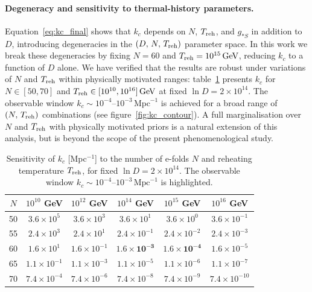 \paragraph{Degeneracy and sensitivity to thermal-history parameters.}
Equation~\eqref{eq:kc_final} shows that $k_c$ depends on $N$, $T_{\rm reh}$,
and $g_{*S}$ in addition to $D$, introducing degeneracies in the
$(D,\,N,\,T_{\rm reh})$ parameter space.
In this work we break these degeneracies by fixing $N = 60$ and
$T_{\rm reh} = 10^{15}\,\mathrm{GeV}$, reducing $k_c$ to a function of $D$
alone. We have verified that the results are robust under variations of $N$
and $T_{\rm reh}$ within physically motivated ranges:
table~\ref{tab:sensitivity} presents $k_c$ for
$N \in [50,70]$ and $T_{\rm reh} \in [10^{10}, 10^{16}]\,\mathrm{GeV}$
at fixed $\ln D = 2\times 10^{14}$.
The observable window $k_c \sim 10^{-4}$--$10^{-3}\,\mathrm{Mpc}^{-1}$
is achieved for a broad range of $(N,\,T_{\rm reh})$ combinations
(see figure~\ref{fig:kc_contour}).
A full marginalisation over $N$ and $T_{\rm reh}$ with physically motivated
priors is a natural extension of this analysis, but is beyond the scope of
the present phenomenological study.

\begin{table}[t]
  \centering
  \caption{Sensitivity of $k_c$ [Mpc$^{-1}$] to the number of e-folds $N$
    and reheating temperature $T_{\rm reh}$, for fixed
    $\ln D = 2\times 10^{14}$.
    The observable window
    $k_c \sim 10^{-4}$--$10^{-3}\,\mathrm{Mpc}^{-1}$ is highlighted.}
  \label{tab:sensitivity}
  \begin{tabular}{cccccc}
    \hline\hline
    $N$ & $10^{10}$ GeV & $10^{12}$ GeV & $10^{14}$ GeV
        & $10^{15}$ GeV & $10^{16}$ GeV \\
    \hline
    50 & $3.6\times 10^{5}$ & $3.6\times 10^{3}$ & $3.6\times 10^{1}$
       & $3.6\times 10^{0}$ & $3.6\times 10^{-1}$ \\
    55 & $2.4\times 10^{3}$ & $2.4\times 10^{1}$ & $2.4\times 10^{-1}$
       & $2.4\times 10^{-2}$ & $2.4\times 10^{-3}$ \\
    60 & $1.6\times 10^{1}$ & $1.6\times 10^{-1}$ & $\mathbf{1.6\times 10^{-3}}$
       & $\mathbf{1.6\times 10^{-4}}$ & $1.6\times 10^{-5}$ \\
    65 & $1.1\times 10^{-1}$ & $1.1\times 10^{-3}$ & $1.1\times 10^{-5}$
       & $1.1\times 10^{-6}$ & $1.1\times 10^{-7}$ \\
    70 & $7.4\times 10^{-4}$ & $7.4\times 10^{-6}$ & $7.4\times 10^{-8}$
       & $7.4\times 10^{-9}$ & $7.4\times 10^{-10}$ \\
    \hline\hline
  \end{tabular}
\end{table}

